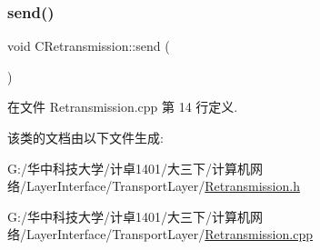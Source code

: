 \mbox{\label{class_c_retransmission_a2a97991aa1bd05adf369d0a1b38b2a10}} 
\subsubsection{\texorpdfstring{send()}{send()}}
{\footnotesize\ttfamily void C\+Retransmission\+::send (\begin{DoxyParamCaption}{ }\end{DoxyParamCaption})\hspace{0.3cm}{\ttfamily [virtual]}}



在文件 Retransmission.\+cpp 第 14 行定义.



该类的文档由以下文件生成\+:\begin{DoxyCompactItemize}
\item 
G\+:/华中科技大学/计卓1401/大三下/计算机网络/\+Layer\+Interface/\+Transport\+Layer/\hyperlink{_retransmission_8h}{Retransmission.\+h}\item 
G\+:/华中科技大学/计卓1401/大三下/计算机网络/\+Layer\+Interface/\+Transport\+Layer/\hyperlink{_retransmission_8cpp}{Retransmission.\+cpp}\end{DoxyCompactItemize}
